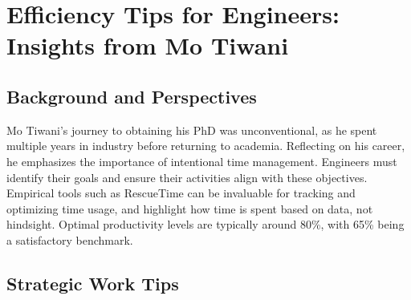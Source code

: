 
\section{Efficiency Tips for Engineers: Insights from Mo Tiwani}
\label{sec:efficiency_tips}


\subsection{Background and Perspectives}

Mo Tiwani's journey to obtaining his PhD was unconventional, as he spent multiple years in industry before returning to academia.
Reflecting on his career, he emphasizes the importance of intentional time management.
Engineers must identify their goals and ensure their activities align with these objectives.
Empirical tools such as RescueTime can be invaluable for tracking and optimizing time usage, and highlight how time is spent based on data, not hindsight.
Optimal productivity levels are typically around 80\%, with 65\% being a satisfactory benchmark.

\subsection{Strategic Work Tips}


